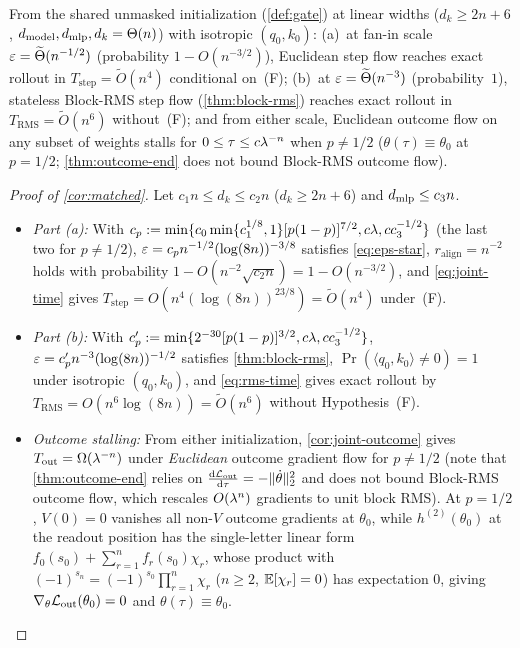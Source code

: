 \begin{corollary}
\label{cor:matched}
From the shared unmasked initialization (\cref{def:gate}) at linear widths ($d_k \ge 2n+6$, $d_{\mathrm{model}}, d_{\mathrm{mlp}}, d_k = \Theta(n)$) with isotropic $(q_0, k_0)$: (a)~at fan-in scale $\varepsilon = \widetilde\Theta(n^{-1/2})$ (probability $1 - O(n^{-3/2})$), Euclidean step flow reaches exact rollout in $T_{\mathrm{step}} = \widetilde O(n^4)$ conditional on~(F); (b)~at $\varepsilon = \widetilde\Theta(n^{-3})$ (probability~$1$), stateless Block-RMS step flow (\cref{thm:block-rms}) reaches exact rollout in $T_{\mathrm{RMS}} = \widetilde O(n^6)$ without~(F); and from either scale, Euclidean outcome flow on any subset of weights stalls for $0 \le \tau \le c\lambda^{-n}$ when $p \ne 1/2$ ($\theta(\tau) \equiv \theta_0$ at $p = 1/2$; \cref{thm:outcome-end} does not bound Block-RMS outcome flow).
\end{corollary}
\begin{proof}[Proof of \cref{cor:matched}]
Let $c_1 n \le d_k \le c_2 n$ ($d_k \ge 2n+6$) and $d_{\mathrm{mlp}} \le c_3 n$.
\begin{itemize}[leftmargin=*]
\item \emph{Part (a):} With $c_p := \min\{c_0\min\{c_1^{1/8}, 1\}[p(1-p)]^{7/2}, c\lambda, c c_3^{-1/2}\}$ (the last two for $p \ne 1/2$), $\varepsilon = c_p n^{-1/2}(\log(8n))^{-3/8}$ satisfies \cref{eq:eps-star}, $r_{\mathrm{align}} = n^{-2}$ holds with probability $1 - O(n^{-2}\sqrt{c_2 n}) = 1 - O(n^{-3/2})$, and \cref{eq:joint-time} gives $T_{\mathrm{step}} = O(n^4(\log(8n))^{23/8}) = \widetilde O(n^4)$ under~(F).
\item \emph{Part (b):} With $c_p' := \min\{2^{-30}[p(1-p)]^{3/2}, c\lambda, c c_3^{-1/2}\}$, $\varepsilon = c_p' n^{-3}(\log(8n))^{-1/2}$ satisfies \cref{thm:block-rms}, $\Pr(\langle q_0, k_0\rangle \ne 0) = 1$ under isotropic $(q_0, k_0)$, and \cref{eq:rms-time} gives exact rollout by $T_{\mathrm{RMS}} = O(n^6\log(8n)) = \widetilde O(n^6)$ without Hypothesis~(F).
\item \emph{Outcome stalling:} From either initialization, \cref{cor:joint-outcome} gives $T_{\mathrm{out}} = \Omega(\lambda^{-n})$ under \emph{Euclidean} outcome gradient flow for $p \ne 1/2$ (note that \cref{thm:outcome-end} relies on $\ddtau{\Lout} = -\|\dot\theta\|_2^2$ and does not bound Block-RMS outcome flow, which rescales $O(\lambda^n)$ gradients to unit block RMS). At $p = 1/2$, $V(0) = 0$ vanishes all non-$V$ outcome gradients at $\theta_0$, while $h^{(2)}(\theta_0)$ at the readout position has the single-letter linear form $f_0(s_0) + \sum_{r=1}^n f_r(s_0)\chi_r$, whose product with $(-1)^{s_n} = (-1)^{s_0}\prod_{r=1}^n \chi_r$ ($n \ge 2$, $\mathbb E[\chi_r] = 0$) has expectation $0$, giving $\nabla_\theta\mathcal L_{\mathrm{out}}(\theta_0) = 0$ and $\theta(\tau) \equiv \theta_0$.\qedhere
\end{itemize}
\end{proof}

